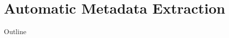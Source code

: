 \documentclass{beamer}
\begin{document}
%
%
%
%
%
%

\section{Automatic Metadata Extraction}


\begin{frame}[noframenumbering]{Outline}
\end{frame}
\end{document}

